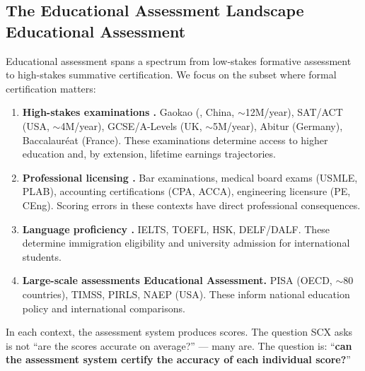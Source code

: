 \documentclass[11pt,a4paper]{article}
\theoremstyle{definition}
\theoremstyle{remark}
\newcommand{\SCX}{\textsc{SCX}}
\begin{document}
\subsection{The Educational Assessment Landscape Educational Assessment}
Educational assessment spans a spectrum from low-stakes formative assessment to high-stakes summative certification. We focus on the subset where formal certification matters:
\begin{enumerate}[label=(\roman*)]
    \item \textbf{High-stakes examinations .} Gaokao (, China, $\sim$12M/year), SAT/ACT (USA, $\sim$4M/year), GCSE/A-Levels (UK, $\sim$5M/year), Abitur (Germany), Baccalauréat (France). These examinations determine access to higher education and, by extension, lifetime earnings trajectories.
    \item \textbf{Professional licensing .} Bar examinations, medical board exams (USMLE, PLAB), accounting certifications (CPA, ACCA), engineering licensure (PE, CEng). Scoring errors in these contexts have direct professional consequences.
    \item \textbf{Language proficiency .} IELTS, TOEFL, HSK, DELF/DALF. These determine immigration eligibility and university admission for international students.
    \item \textbf{Large-scale assessments Educational Assessment.} PISA (OECD, $\sim$80 countries), TIMSS, PIRLS, NAEP (USA). These inform national education policy and international comparisons.
\end{enumerate}
In each context, the assessment system produces scores. The question \SCX{} asks is not ``are the scores accurate on average?'' — many are. The question is: ``\textbf{can the assessment system certify the accuracy of each individual score?}''
\end{document}
